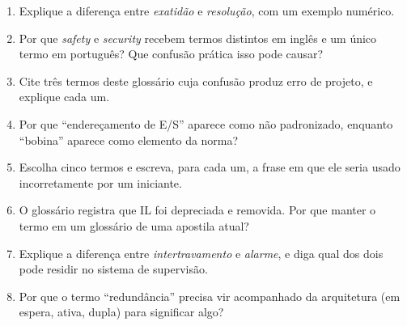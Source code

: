 \begin{exercicios}
\begin{enumerate}[label=\alph*)]
  \item Explique a diferença entre \emph{exatidão} e \emph{resolução}, com um exemplo numérico.
  \item Por que \emph{safety} e \emph{security} recebem termos distintos em inglês e um único termo
        em português? Que confusão prática isso pode causar?
  \item Cite três termos deste glossário cuja confusão produz erro de projeto, e explique cada um.
  \item Por que ``endereçamento de E/S'' aparece como não padronizado, enquanto ``bobina'' aparece como
        elemento da norma?
  \item Escolha cinco termos e escreva, para cada um, a frase em que ele seria usado incorretamente por
        um iniciante.
  \item O glossário registra que IL foi depreciada e removida. Por que manter o termo em um glossário
        de uma apostila atual?
  \item Explique a diferença entre \emph{intertravamento} e \emph{alarme}, e diga qual dos dois pode
        residir no sistema de supervisão.
  \item Por que o termo ``redundância'' precisa vir acompanhado da arquitetura (em espera, ativa,
        dupla) para significar algo?
\end{enumerate}
\end{exercicios}

